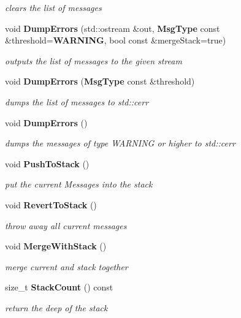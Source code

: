 \begin{DoxyCompactItemize}
\begin{DoxyCompactList}\small\item\em clears the list of messages \end{DoxyCompactList}\item 
void {\bf \-Dump\-Errors} (std\-::ostream \&out, {\bf \-Msg\-Type} const \&threshold={\bf \-W\-A\-R\-N\-I\-N\-G}, bool const \&merge\-Stack=true)
\begin{DoxyCompactList}\small\item\em outputs the list of messages to the given stream \end{DoxyCompactList}\item 
void {\bf \-Dump\-Errors} ({\bf \-Msg\-Type} const \&threshold)
\begin{DoxyCompactList}\small\item\em dumps the list of messages to std\-::cerr \end{DoxyCompactList}\item 
void {\bf \-Dump\-Errors} ()
\begin{DoxyCompactList}\small\item\em dumps the messages of type \-W\-A\-R\-N\-I\-N\-G or higher to std\-::cerr \end{DoxyCompactList}\item 
void {\bf \-Push\-To\-Stack} ()
\begin{DoxyCompactList}\small\item\em put the current \-Messages into the stack \end{DoxyCompactList}\item 
void {\bf \-Revert\-To\-Stack} ()\label{classGlobalError_a545a1a225fd4c4cf0ba9b3778c7ba974}

\begin{DoxyCompactList}\small\item\em throw away all current messages \end{DoxyCompactList}\item 
void {\bf \-Merge\-With\-Stack} ()\label{classGlobalError_ad673c5ed8a108766a94f4d50d663c57c}

\begin{DoxyCompactList}\small\item\em merge current and stack together \end{DoxyCompactList}\item 
size\-\_\-t {\bf \-Stack\-Count} () const \label{classGlobalError_a5899d10ec4abae5a4b17552f535e4352}

\begin{DoxyCompactList}\small\item\em return the deep of the stack \end{DoxyCompactList}\end{DoxyCompactItemize}


